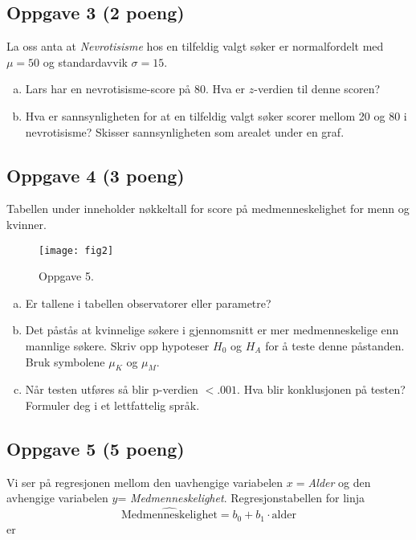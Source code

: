\documentclass[12pt,a4paper, norsk]{article}
\begin{document}
\subsection*{Oppgave 3  (2 poeng) }
La oss anta at  {\it Nevrotisisme} hos en tilfeldig valgt 
søker er normalfordelt med  $\mu=50$   og standardavvik $\sigma=15$. 



\begin{enumerate}[(a)]
	
	\item  Lars har en nevrotisisme-score på 80. Hva er $z$-verdien til denne scoren?
	
	\item Hva er sannsynligheten for at en tilfeldig valgt søker scorer mellom 20 og 80 i nevrotisisme? Skisser sannsynligheten som arealet under en graf.
	

	\end{enumerate}		
%




	
	
\subsection*{Oppgave 4  (3 poeng) }
	
	Tabellen under  inneholder nøkkeltall for score på medmenneskelighet for menn og kvinner. 
	\begin{figure}[htp]
		\centering
		\texttt{[image: fig2]}
		\caption{Oppgave 5.}
		\label{fig:2}
	\end{figure}


	
	 \begin{enumerate}[(a)]
	
	\item  Er tallene i tabellen observatorer eller parametre?
	
	\item Det påstås at kvinnelige søkere  i gjennomsnitt er mer medmenneskelige enn mannlige søkere. Skriv opp hypoteser $H_0$ og $H_A$ for å teste denne påstanden. Bruk symbolene $\mu_K$ og $\mu_M$. 
	
	
	\item Når testen utføres så blir p-verdien $< .001$. Hva blir konklusjonen på testen? Formuler deg i et lettfattelig språk. 
	 
\end{enumerate}		
		
		
\subsection*{Oppgave 5  (5 poeng) }
			Vi ser på regresjonen mellom den uavhengige variabelen $x=${\it Alder} og den avhengige variabelen $y$=
			{\it Medmenneskelighet}.
		 Regresjonstabellen for linja $$\widehat{\text{Medmenneskelighet}}=b_0+b_1\cdot \text{alder}$$ er
			
\end{document}
